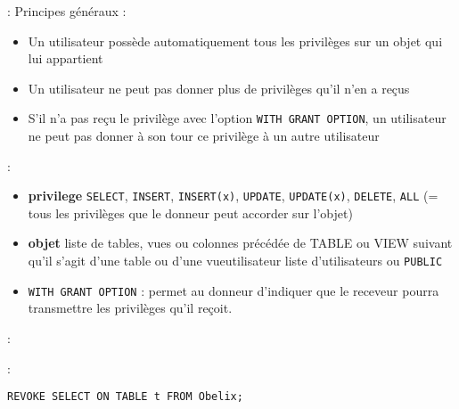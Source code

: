 \documentclass[10pt]{beamer}
\begin{document}
\begin{frame}{\secname : \subsecname}
    Principes généraux :
    \begin{itemize}
        \item Un utilisateur possède automatiquement tous les privilèges sur un objet qui lui appartient
        \item Un utilisateur ne peut pas donner plus de privilèges qu'il n'en a reçus
        \item S'il n'a pas reçu le privilège avec l'option \lstinline[language=plsql]!WITH GRANT OPTION!, un utilisateur ne peut pas donner à son tour ce privilège à un autre utilisateur
    \end{itemize}
\end{frame}

\begin{frame}{\secname : \subsecname}
    
    \begin{itemize}
        \item \textbf{privilege} \lstinline[language=plsql]!SELECT!, \lstinline[language=plsql]!INSERT!, \lstinline[language=plsql]!INSERT(x)!, \lstinline[language=plsql]!UPDATE!, \lstinline[language=plsql]!UPDATE(x)!, \lstinline[language=plsql]!DELETE!, \lstinline[language=plsql]!ALL! (= tous les privilèges que le donneur peut accorder sur l'objet)
        \item \textbf{objet} liste de tables, vues ou colonnes précédée de TABLE ou VIEW suivant qu'il s'agit d'une table ou d'une vueutilisateur liste d'utilisateurs ou \lstinline[language=plsql]!PUBLIC!
        \item \lstinline[language=plsql]!WITH GRANT OPTION! : permet au donneur d'indiquer que le receveur pourra transmettre les privilèges qu'il reçoit.
    \end{itemize}

\end{frame}


\begin{frame}{\secname : \subsecname}
    
\end{frame}

\begin{frame}{\secname : \subsecname}
    
    \lstinline[language=plsql]!REVOKE SELECT ON TABLE t FROM Obelix;!
\end{frame}
\end{document}
